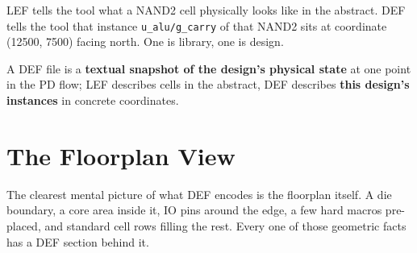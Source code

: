 LEF tells the tool what a NAND2 cell physically looks like in the abstract. DEF tells the tool that instance \texttt{u\_alu/g\_carry} of that NAND2 sits at coordinate (12500, 7500) facing north. One is library, one is design.

\begin{keyidea}
A DEF file is a \textbf{textual snapshot of the design's physical state} at one point in the PD flow; LEF describes cells in the abstract, DEF describes \textbf{this design's instances} in concrete coordinates.
\end{keyidea}

\section{The Floorplan View}

The clearest mental picture of what DEF encodes is the floorplan itself. A die boundary, a core area inside it, IO pins around the edge, a few hard macros pre-placed, and standard cell rows filling the rest. Every one of those geometric facts has a DEF section behind it.

